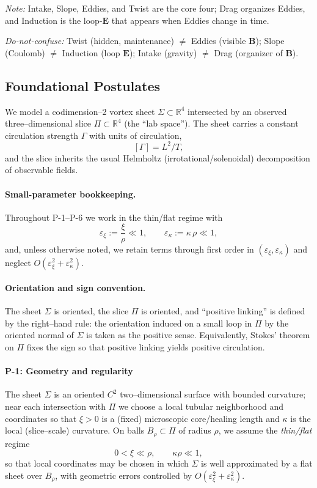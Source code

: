 \emph{Note:} Intake, Slope, Eddies, and Twist are the core four; Drag organizes Eddies, and Induction is the loop-$\mathbf E$ that appears when Eddies change in time.

\textit{Do-not-confuse:} Twist (hidden, maintenance) $\neq$ Eddies (visible $\mathbf B$); Slope (Coulomb) $\neq$ Induction (loop $\mathbf E$); Intake (gravity) $\neq$ Drag (organizer of $\mathbf B$).

\subsection{Foundational Postulates}
\label{sec:foundational-postulates}

We model a codimension–2 vortex sheet $\Sigma\subset\mathbb{R}^4$ intersected by an observed three–dimensional slice $\Pi\subset\mathbb{R}^4$ (the “lab space”). The sheet carries a constant circulation strength $\Gamma$ with units of circulation,
\[
[\Gamma]=L^2/T,
\]
and the slice inherits the usual Helmholtz (irrotational/solenoidal) decomposition of observable fields.

\paragraph*{Small-parameter bookkeeping.}
Throughout P-1–P-6 we work in the thin/flat regime with
\[
\varepsilon_\xi := \frac{\xi}{\rho}\ll 1,\qquad
\varepsilon_\kappa := \kappa\,\rho \ll 1,
\]
and, unless otherwise noted, we retain terms through first order in $(\varepsilon_\xi,\varepsilon_\kappa)$ and neglect $O(\varepsilon_\xi^2+\varepsilon_\kappa^2)$.

\paragraph*{Orientation and sign convention.}
The sheet $\Sigma$ is oriented, the slice $\Pi$ is oriented, and “positive linking'' is defined by the right–hand rule: the orientation induced on a small loop in $\Pi$ by the oriented normal of $\Sigma$ is taken as the positive sense. Equivalently, Stokes' theorem on $\Pi$ fixes the sign so that positive linking yields positive circulation.

\paragraph{P-1: Geometry and regularity}
\label{post:P1}
The sheet $\Sigma$ is an oriented $C^2$ two–dimensional surface with bounded curvature; near each intersection with $\Pi$ we choose a local tubular neighborhood and coordinates so that $\xi>0$ is a (fixed) microscopic core/healing length and $\kappa$ is the local (slice–scale) curvature. On balls $B_\rho\subset\Pi$ of radius $\rho$, we assume the \emph{thin/flat} regime
\[
0<\xi \ll \rho, \qquad \kappa\rho \ll 1,
\]
so that local coordinates may be chosen in which $\Sigma$ is well approximated by a flat sheet over $B_\rho$, with geometric errors controlled by $O(\varepsilon_\xi^2+\varepsilon_\kappa^2)$.

